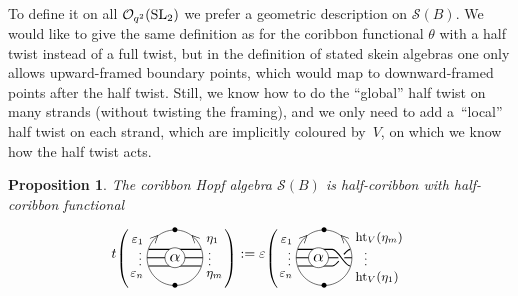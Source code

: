 \documentclass[pdftex]{sigma}%
\numberwithin{equation}{section}
\newtheorem{Proposition}[Theorem]{Proposition}
 { \theoremstyle{definition}
\newtheorem{Definition}[Theorem]{Definition}
\newtheorem{Note}[Theorem]{Note}
\newtheorem{Example}[Theorem]{Example}
\newtheorem{Remark}[Theorem]{Remark} }
\newcommand{\halft}{{\operatorname{ht}}}
\newcommand{\Oq}{\mathcal{O}_{q^2}({\rm SL}_2)}
\begin{document}
To define it on all $\Oq$ we prefer a geometric description on $\mathscr{S}(B)$. We would like to give the same definition as for the coribbon functional $\theta$ with a half twist instead of a full twist, but in the definition of stated skein algebras one only allows upward-framed boundary points, which would map to downward-framed points after the half twist. Still, we know how to do the ``global'' half twist on many strands (without twisting the framing), and we only need to add a~``local'' half twist on each strand, which are implicitly coloured by~$V$, on which we know how the half twist acts.

\begin{Proposition}
The coribbon Hopf algebra $\mathscr{S}(B)$ is half-coribbon with half-coribbon functional
\[
t\raisebox{-3pt}{$\left(\rule{0pt}{24pt}\right.$}\!\!
\begin{tikzpicture}[scale = 0.7, baseline = 0pt]
\draw (0,-1) node{\small $\bullet$} arc(-90:90:1) node[near end, sloped]{\small $<$} node{\small $\bullet$};
\draw (0,-1) arc(-90:-270:1) node[near end, sloped]{\small $>$};
\draw[thick] (-0.94,-0.3)node[below left]{\small $\varepsilon_n$} -- (0.94,-0.3)node[below right]{\small $\eta_m$};
\draw[thick] (-1,0) node[yshift=2pt,left]{\footnotesize $\vdots$} -- (1,0)node[yshift=2pt,right]{\footnotesize $\vdots$};
\draw[thick] (-0.94,0.3) node[above left]{\small $\varepsilon_1$} -- (0.94,0.3)node[above right]{\small $\eta_1$};
\node[circle, fill=white, draw = black, scale = 1.2, inner sep = 1.5pt] (X) at (0,0){$\alpha$};
\end{tikzpicture}\!\!
\raisebox{-3pt}{$\left.\rule{0pt}{24pt}\right)$}
:= \varepsilon\raisebox{-3pt}{$\left(\rule{0pt}{24pt}\right.$}\!\!
\begin{tikzpicture}[scale = 0.7, baseline = 0pt]
\draw (0,-1) node{\small $\bullet$} arc(-90:90:1) node[near end, sloped]{\small $<$} node{\small $\bullet$};
\draw (0,-1) arc(-90:-270:1) node[near end, sloped]{\small $>$};
\draw[thick] (-0.94,-0.3)node[below left]{\small $\varepsilon_n$} -- (0.3,-0.3) .. controls (0.5,-0.3) and (0.74,0.3).. (0.94,0.3)node[above right]{\small $\halft_V(\eta_m)$} node[pos = 0.5, circle, fill = white, scale = 0.66]{};
\draw[thick] (-1,0) node[yshift=2pt, left]{\footnotesize $\vdots$} -- (1,0)node[yshift=2pt,right=5pt]{\footnotesize $\vdots$} node[pos = 0.81, circle, fill = white, scale = 0.46]{};
\draw[thick] (-0.94,0.3) node[above left]{\small $\varepsilon_1$} -- (0.3,0.3) .. controls (0.5,0.3) and (0.74,-0.3).. (0.94,-0.3)node[below right]{\small $\halft_V(\eta_1)$};
\node[circle, fill=white, draw = black, scale = 1.2, inner sep = 1.5pt] (X) at (-0.2,0){$\alpha$};

\end{tikzpicture}\]
\end{Proposition}
\end{document}
